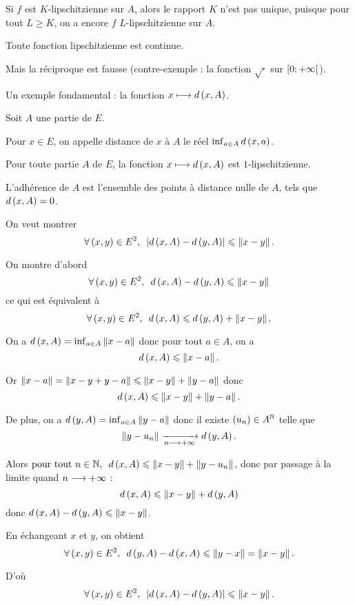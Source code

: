 \begin{rem}
Si \(f\) est \(K\)-lipschitzienne sur \(A\), alors le rapport \(K\) n'est pas unique, puisque pour tout \(L\geq K\), on a encore \(f\) \(L\)-lipschitzienne sur \(A\).
\end{rem}

\begin{prop}
Toute fonction lipschitzienne est continue.
\end{prop}

Mais la réciproque est fausse (contre-exemple : la fonction \(\sqrt{\cdot}\) sur \(\left[0;+\infty\right[\)).

Un exemple fondamental : la fonction \(x\longmapsto d\left(x,A\right)\).

\begin{defi}
Soit \(A\) une partie de \(E\).

Pour \(x\in E\), on appelle distance de \(x\) à \(A\) le réel \(\inf_{a\in A}d\left(x,a\right)\).
\end{defi}

\begin{prop}
Pour toute partie \(A\) de \(E\), la fonction \(x\longmapsto d\left(x,A\right)\) est \(1\)-lipschitzienne.

L'adhérence de \(A\) est l'ensemble des points à distance nulle de \(A\), \ie tels que \(d\left(x,A\right)=0\).
\end{prop}

\begin{dem}
On veut montrer \[\quantifs{\forall\paren{x,y}\in E^2}\abs{d\paren{x,A}-d\paren{y,A}}\leq\norme{x-y}.\]

On montre d'abord \[\quantifs{\forall\paren{x,y}\in E^2}d\paren{x,A}-d\paren{y,A}\leq\norme{x-y}\] ce qui est équivalent à \[\quantifs{\forall\paren{x,y}\in E^2}d\paren{x,A}\leq d\paren{y,A}+\norme{x-y}.\]

On a \(d\paren{x,A}=\inf_{a\in A}\norme{x-a}\) donc pour tout \(a\in A\), on a \[d\paren{x,A}\leq\norme{x-a}.\]

Or \(\norme{x-a}=\norme{x-y+y-a}\leq\norme{x-y}+\norme{y-a}\) donc \[d\paren{x,A}\leq\norme{x-y}+\norme{y-a}.\]

De plus, on a \(d\paren{y,A}=\inf_{a\in A}\norme{y-a}\) donc il existe \(\left(u_n\right)\in A^{\mathbb{N}}\) telle que \[\norme{y-u_n}\tendqd{n\to\pinf}d\paren{y,A}.\]

Alors \(\quantifs{\tpt n\in\N}d\paren{x,A}\leq\norme{x-y}+\norme{y-u_n}\), donc par passage à la limite quand \(n\longrightarrow+\infty\) : \[d\paren{x,A}\leq\norme{x-y}+d\paren{y,A}\] donc \(d\paren{x,A}-d\paren{y,A}\leq\norme{x-y}\).

En échangeant \(x\) et \(y\), on obtient \[\quantifs{\forall\paren{x,y}\in E^2}d\paren{y,A}-d\paren{x,A}\leq\norme{y-x}=\norme{x-y}.\]

D'où \[\quantifs{\forall\paren{x,y}\in E^2}\abs{d\paren{x,A}-d\paren{y,A}}\leq\norme{x-y}.\]
\end{dem}

